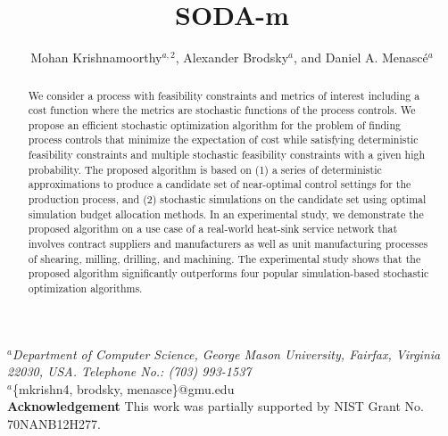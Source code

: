 \documentclass[a4paper, 12pt]{article} %
\title{\textbf{SODA-m} \mycomment{to update}} %
\author{Mohan Krishnamoorthy$^{a,2}$, Alexander Brodsky$^a$, and Daniel A. Menasc\'e$^{a}$} %
\makeatletter
\newcommand\mycomment[1]{\textcolor{red}{\textbf{\textit{(#1)}}}}
\renewcommand{\maketitle}{ %
\begin{flushleft} 
{\large\@title\footnotemark[1]} %

\vspace{20pt} %

{\large\@author} %
\end{flushleft}
}
\makeatother
\begin{document}
\maketitle %

\begin{flushleft} 
\vspace{10pt}
$^a$\textit{Department of Computer Science, George Mason University, Fairfax, Virginia 22030, USA. Telephone No.: (703) 993-1537}\\
\vspace{20pt}
$^a$\{mkrishn4, brodsky, menasce\}@gmu.edu \\
\vspace{20pt}
\textbf{Acknowledgement}\newline
This work was partially supported by NIST Grant No. 70NANB12H277. \newline
\vspace{20pt}
\footnotetext[1]{Word Count: 6319 \mycomment{to update}}
\end{flushleft} 

\newpage
{\large \@title }
\vspace{10pt}


\begin{abstract}{\small\noindent
We consider a process with feasibility constraints and metrics of interest including a cost function where the metrics are stochastic functions of the process controls. We propose an efficient stochastic optimization algorithm for the problem of finding process controls that minimize the expectation of cost while satisfying deterministic feasibility constraints and multiple stochastic feasibility constraints with a given high probability. The proposed algorithm is based on (1) a series of deterministic approximations to produce a candidate set of near-optimal control settings for the production process, and (2) stochastic simulations on the candidate set using optimal simulation budget allocation methods. In an experimental study, we demonstrate the proposed algorithm on a use case of a real-world heat-sink service network that involves contract suppliers and manufacturers as well as unit manufacturing processes of shearing, milling, drilling, and machining. The experimental study shows that the proposed algorithm significantly outperforms four popular simulation-based stochastic optimization algorithms.
}
\end{abstract}
\end{document}
